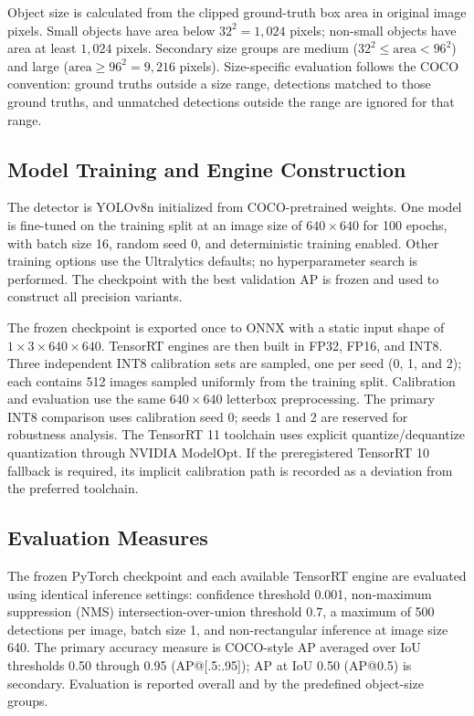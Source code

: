 Object size is calculated from the clipped ground-truth box area in original
image pixels. Small objects have area below $32^2=1{,}024$ pixels; non-small
objects have area at least $1{,}024$ pixels. Secondary size groups are medium
($32^2 \leq \mathrm{area} < 96^2$) and large
($\mathrm{area} \geq 96^2=9{,}216$ pixels). Size-specific evaluation follows
the COCO convention: ground truths outside a size range, detections matched to
those ground truths, and unmatched detections outside the range are ignored for
that range.

\subsection{Model Training and Engine Construction}
The detector is YOLOv8n initialized from COCO-pretrained weights. One model is
fine-tuned on the training split at an image size of $640 \times 640$ for 100
epochs, with batch size 16, random seed 0, and deterministic training enabled.
Other training options use the Ultralytics defaults; no hyperparameter search is
performed. The checkpoint with the best validation AP is frozen and used to
construct all precision variants.

The frozen checkpoint is exported once to ONNX with a static input shape of
$1 \times 3 \times 640 \times 640$. TensorRT engines are then built in FP32,
FP16, and INT8. Three independent INT8 calibration sets are sampled, one per
seed (0, 1, and 2); each contains 512 images sampled uniformly from the training
split. Calibration and evaluation use the same $640 \times 640$ letterbox
preprocessing. The primary INT8 comparison uses calibration seed 0; seeds 1 and
2 are reserved for robustness analysis. The TensorRT 11 toolchain uses explicit
quantize/dequantize quantization through NVIDIA ModelOpt. If the preregistered
TensorRT 10 fallback is required, its implicit calibration path is recorded as
a deviation from the preferred toolchain.

\subsection{Evaluation Measures}
The frozen PyTorch checkpoint and each available TensorRT engine are evaluated
using identical inference settings: confidence threshold 0.001, non-maximum
suppression (NMS) intersection-over-union threshold 0.7, a maximum of 500
detections per image, batch size 1, and non-rectangular inference at image size
640. The primary accuracy measure is COCO-style AP averaged over IoU thresholds
0.50 through 0.95 (AP@[.5:.95]); AP at IoU 0.50 (AP@0.5) is secondary.
Evaluation is reported overall and by the predefined object-size groups.

